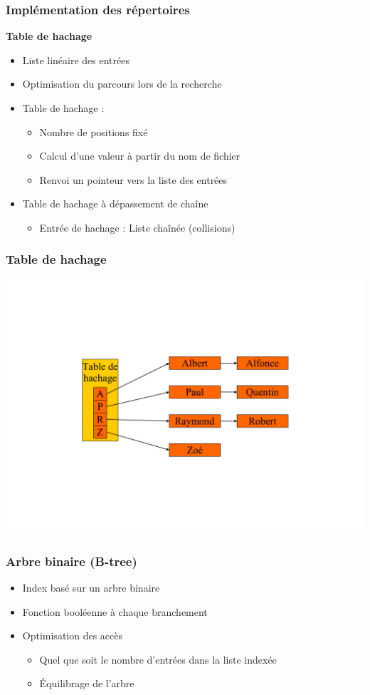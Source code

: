 \begin{frame}
\frametitle{Implémentation des répertoires}
\textbf{Table de hachage}
\begin{itemize}
\item Liste linéaire des entrées
\item Optimisation du parcours lors de la recherche
\item Table de hachage :
\begin{itemize}
\item Nombre de positions fixé
\item Calcul d'une valeur à partir du nom de fichier
\item Renvoi un pointeur vers la liste des entrées
\end{itemize}
\item Table de hachage à dépassement de chaîne
\begin{itemize}
\item Entrée de hachage : Liste chaînée (collisions)
\end{itemize}
\end{itemize}
\end{frame}

\begin{frame}
\frametitle{Table de hachage}
\includegraphics[width=.9\textwidth]{../illustration/table_hachage.pdf}
\end{frame}

\begin{frame}
\frametitle{Arbre binaire (B-tree)}
\begin{itemize}
\item Index basé sur un arbre binaire
\item Fonction booléenne à chaque branchement
\item Optimisation des accès
\begin{itemize}
\item Quel que soit le nombre d'entrées dans la liste indexée
\item Équilibrage de l'arbre
\end{itemize}
\end{itemize}
\end{frame}

